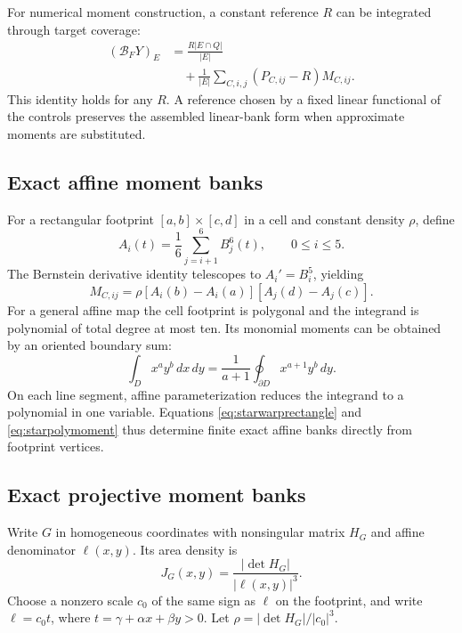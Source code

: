 \documentclass[journal]{IEEEtran}
\begin{document}
For numerical moment construction, a constant reference $R$ can be integrated
through target coverage:
\begin{align}
 (\mathcal B_FY)_E
 &=\frac{R|E\cap Q|}{|E|}\nonumber\\
 &\quad+\frac1{|E|}\sum_{C,i,j}(P_{C,ij}-R)M_{C,ij}.
 \label{eq:starwarpfunctional}
\end{align}
This identity holds for any $R$. A reference chosen by a fixed linear
functional of the controls preserves the assembled linear-bank form when
approximate moments are substituted.

\subsection{Exact affine moment banks}
For a rectangular footprint $[a,b]\times[c,d]$ in a cell and constant density
$\rho$, define
\begin{equation}
 A_i(t)=\frac16\sum_{j=i+1}^6B_j^6(t),\qquad 0\leq i\leq5.
\end{equation}
The Bernstein derivative identity telescopes to $A_i'=B_i^5$, yielding
\begin{equation}
 M_{C,ij}=\rho[A_i(b)-A_i(a)][A_j(d)-A_j(c)].
 \label{eq:starwarprectangle}
\end{equation}
For a general affine map the cell footprint is polygonal and the integrand
is polynomial of total degree at most ten. Its monomial moments can be
obtained by an oriented boundary sum:
\begin{equation}
 \int_D x^ay^b\,dx\,dy
 =\frac1{a+1}\oint_{\partial D}x^{a+1}y^b\,dy.
 \label{eq:starpolymoment}
\end{equation}
On each line segment, affine parameterization reduces the integrand to a
polynomial in one variable. Equations \eqref{eq:starwarprectangle} and
\eqref{eq:starpolymoment} thus determine finite exact affine banks directly
from footprint vertices.

\subsection{Exact projective moment banks}
Write $G$ in homogeneous coordinates with nonsingular matrix $H_G$ and affine
denominator $\ell(x,y)$. Its area density is
\begin{equation}
 J_G(x,y)=\frac{|\det H_G|}{|\ell(x,y)|^3}.
\end{equation}
Choose a nonzero scale $c_0$ of the same sign as $\ell$ on the footprint,
and write $\ell=c_0t$, where $t=\gamma+\alpha x+\beta y>0$.
Let $\rho=|\det H_G|/|c_0|^3$.
\end{document}
